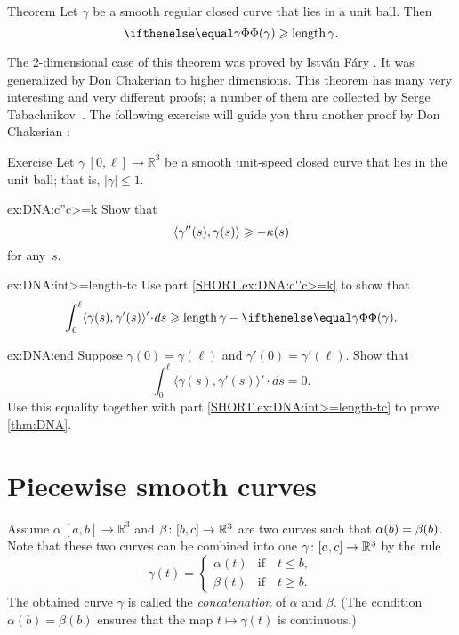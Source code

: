 \begin{thm}{Theorem}\label{thm:DNA}
Let $\gamma$ be a smooth regular closed curve that lies in a unit ball.
Then 
\[\tc\gamma\ge \length\gamma.\]

\end{thm}

The 2-dimensional case of this theorem was proved by Istv\'{a}n F\'{a}ry \cite{fary1950}.
It was generalized by Don Chakerian \cite{chakerian1962} to higher dimensions.
This theorem has many very interesting and very different proofs;
a number of them are collected by Serge Tabachnikov~\cite{tabachnikov}.
The following exercise will guide you thru another proof by Don Chakerian \cite{chakerian1964}:

\begin{thm}{Exercise}\label{ex:DNA}
Let $\gamma\:[0,\ell]\to\mathbb{R}^3$ be a smooth unit-speed closed curve that lies in the unit ball; that is, $|\gamma|\le 1$.

\begin{subthm}{ex:DNA:c''c>=k}
Show that 
\[\langle\gamma''(s),\gamma(s)\rangle\geqslant-\kappa(s)\]
for any~$s$.
\end{subthm}

\begin{subthm}{ex:DNA:int>=length-tc}
Use part \ref{SHORT.ex:DNA:c''c>=k} to show that 
\[\int_0^\ell\langle\gamma(s),\gamma'(s)\rangle'\cdot ds\ge
\length\gamma-\tc\gamma.\]

\end{subthm}

\begin{subthm}{ex:DNA:end}
Suppose $\gamma(0)=\gamma(\ell)$ and $\gamma'(0)=\gamma'(\ell)$.
Show that 
\[\int_0^\ell\langle\gamma(s),\gamma'(s)\rangle'\cdot ds=0.\]
Use this equality together with  part \ref{SHORT.ex:DNA:int>=length-tc} to prove \ref{thm:DNA}.
\end{subthm}
\end{thm}

\section{Piecewise smooth curves}

Assume $\alpha\:[a,b]\to \mathbb{R}^3$ and $\beta\:[b,c]\z\to \mathbb{R}^3$ are two curves such that $\alpha(b)\z=\beta(b)$.
Note that these two curves can be combined into one $\gamma\:[a,c]\z\to \mathbb{R}^3$ by the rule 
\[\gamma(t)=
\begin{cases}
\alpha(t)&\text{if}\quad t\le b,
\\
\beta(t)&\text{if}\quad t\ge b.
\end{cases}
\]
The obtained curve $\gamma$ is called the 
\emph{concatenation} of $\alpha$ and $\beta$.
(The condition $\alpha(b)=\beta(b)$ ensures that the map $t\mapsto\gamma(t)$ is continuous.)


